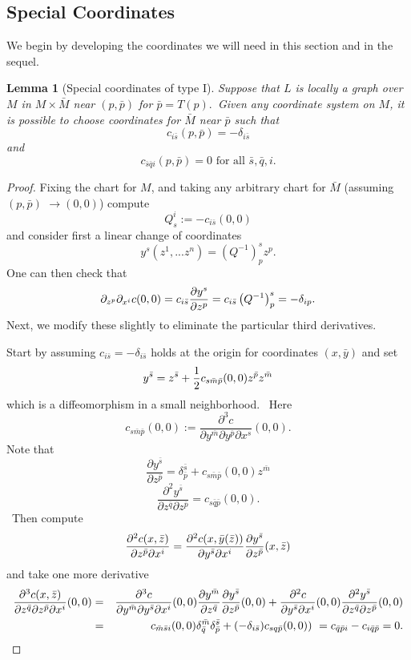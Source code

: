 \documentclass[12pt,letterpaper]{amsart}%
\newcounter{mycounter}
\numberwithin{mycounter}{section}
\theoremstyle{plain}
\newtheorem{lemma}[mycounter]{Lemma}
\numberwithin{equation}{section}
\theoremstyle{definition}
\begin{document}
\subsection{Special Coordinates}
We begin by developing the coordinates we will need in this section and in the sequel.

\begin{lemma}[Special coordinates of type I] \label{srecial coords lemma}
Suppose that $L$ is locally a graph over $M$ in $M\times \bar{M}$ near $(p,%
\bar{p})$ for $\bar{p}=T(p).$\ Given any coordinate system on $M$, it is
possible to choose coordinates for $\bar{M}$ near $\bar{p}$ such that  
\[
c_{i\bar{s}}\left( p,\bar{p}\right) =-\delta _{i\bar{s}}
\]%
and 
\[
c_{\bar{s}\bar{q}i}(p,\bar{p})=0\text{ for all }\bar{s},\bar{q},i.
\]
\end{lemma}

\begin{proof}
Fixing the chart for $M$, and taking any arbitrary chart for $\bar{M}$
(assuming $(p,\bar{p})$ $\rightarrow (0,0)$) compute 
\[
Q_{s}^{i}:=-c_{i\bar{s}}(0,0)
\]%
and consider first a linear change of coordinates 
\[
y^{s}\left( z^{1},...z^{n}\right) =\left( Q^{-1}\right) _{p}^{s}z^{p}.
\]%
One can then check that 
\[
\partial _{z^{p}}\partial _{x^{i}}c(0,0)=c_{i\bar{s}}\frac{\partial y^{s}}{%
\partial z^{p}}=c_{i\bar{s}}\left( Q^{-1}\right) _{p}^{s}=-\delta _{ip}.
\]%
Next, we modify these slightly to eliminate the particular third derivatives.
\ \ 

Start by assuming $c_{i\bar{s}}=-\delta _{i\bar{s}}$ holds at the origin for
coordinates $\left( x,\bar{y}\right) $ and set  
\[
y^{\bar{s}}=z^{\bar{s}}+\frac{1}{2}c_{s\bar{m}\bar{p}}(0,0)z^{\bar{p}}z^{%
\bar{m}}
\]%
which is a diffeomorphism in a small neighborhood. \ Here%
\[
c_{s\bar{m}\bar{p}}(0,0):=\frac{\partial ^{3}c}{\partial y^{\bar{m}}\partial
y^{\bar{p}}\partial x^{s}}(0,0).
\]
Note that 
\[
\frac{\partial y^{\bar{s}}}{\partial z^{\bar{p}}}=\delta _{\bar{p}}^{\bar{s}%
}+c_{s\bar{m}\bar{p}}(0,0)z^{\bar{m}}
\]%
\[
\frac{\partial ^{2}y^{\bar{s}}}{\partial z^{\bar{q}}\partial z^{\bar{p}}}%
=c_{s\bar{q}\bar{p}}(0,0).
\]%
\  Then compute  
\[
\frac{\partial ^{2}c(x,\bar{z})}{\partial z^{\bar{p}}\partial x^{i}}=\frac{%
\partial ^{2}c(x,\bar{y}(\bar{z}))}{\partial y^{\bar{s}}\partial x^{i}}\frac{%
\partial y^{\bar{s}}}{\partial z^{\bar{p}}}(x,\bar{z})
\]%
and take one more derivative
\begin{eqnarray*}
\frac{\partial ^{3}c(x,\bar{z})}{\partial z^{\bar{q}}\partial z^{\bar{p}%
}\partial x^{i}}(0,0) &=&\frac{\partial ^{3}c}{\partial y^{\bar{m}}\partial
y^{\bar{s}}\partial x^{i}}(0,0)\frac{\partial y^{\bar{m}}}{\partial z^{\bar{q%
}}}\frac{\partial y^{\bar{s}}}{\partial z^{\bar{p}}}(0,0)+\frac{\partial
^{2}c}{\partial y^{\bar{s}}\partial x^{i}}(0,0)\frac{\partial ^{2}y^{\bar{s}}%
}{\partial z^{\bar{q}}\partial z^{\bar{p}}}(0,0) \\
&=&c_{\bar{m}\bar{s}i}(0,0)\delta _{\bar{q}}^{\bar{m}}\delta _{\bar{p}}^{%
\bar{s}}+(-\delta _{i\bar{s}})c_{sq\bar{p}}(0,0))\ =c_{\bar{q}\bar{p}i}-c_{i%
\bar{q}\bar{p}}=0.
\end{eqnarray*}
\end{proof}
\end{document}
